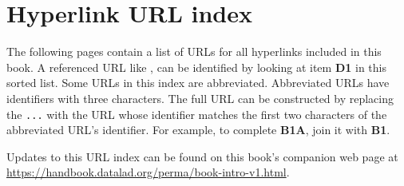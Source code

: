 \titlespacing*{\chapter}{0pt}{0pt}{40pt}
\chapter*{Hyperlink URL index}
\label{\detokenize{appendix:hyperlink-url-index}}

The following pages contain a list of URLs for all hyperlinks included in this
book.  A referenced URL like , can be identified by
looking at item \textbf{D1} in this sorted list. Some URLs in this index are
abbreviated.  Abbreviated URLs have identifiers with three characters. The full
URL can be constructed by replacing the \texttt{...} with the URL whose
identifier matches the first two characters of the abbreviated URL's
identifier.  For example, to complete \textbf{B1A}, join it with \textbf{B1}.

Updates to this URL index can be found on this book's companion web page at\\
\url{https://handbook.datalad.org/perma/book-intro-v1.html}.

\begin{description}
\setlength{\itemsep}{-2mm}
\setlength{\itemindent}{-8.5mm}

\end{description}
